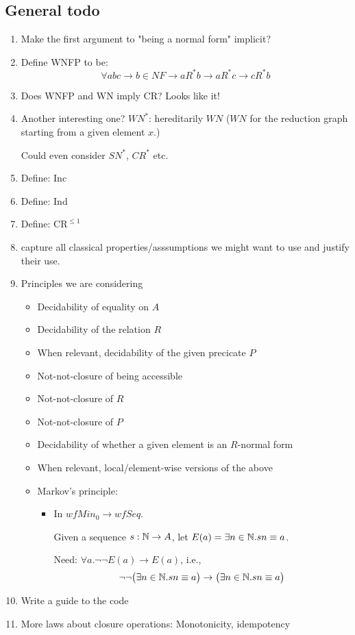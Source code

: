 \documentclass{scrartcl}
\begin{document}
\subsection*{General todo}
\begin{enumerate}
   
  \item  Make the first argument to "being a normal form" implicit?
  \item Define WNFP to be:
  \[\forall a b c \to b \in NF \to a R^* b \to a R^* c \to c R^* b \]
  \item Does WNFP and WN imply CR?  Looks like it!
  \item  Another interesting one? $WN^*$: hereditarily $WN$ ($WN$ for the reduction graph starting from a given element $x$.)

  Could even consider $SN^*$, $CR^*$ etc.
  \item Define: Inc
  \item Define: Ind
  \item Define: $\mathrm{CR}^{\le 1}$
  \item capture all classical properties/asssumptions we might want to use and justify their use. 
  \item Principles we are considering
  \begin{itemize}
    \item Decidability of equality on $A$
    \item Decidability of the relation $R$
    \item When relevant, decidability of the given precicate $P$
    \item Not-not-closure of being accessible
    \item Not-not-closure of $R$
    \item Not-not-closure of $P$
    \item Decidability of whether a given element is an $R$-normal form
    \item When relevant, local/element-wise versions of the above
    \item Markov's principle:
    \begin{itemize}
      \item In $wfMin_0 \to wfSeq$.
  
      Given a sequence $s : \mathbb{N} \to A$, let $E(a) = \exists n \in \mathbb{N}. s n \equiv a$.
  
      Need: $\forall a. \lnot\lnot E(a) \to E(a)$, i.e.,
      \[\lnot\lnot \big(\exists n \in \mathbb{N}. s n \equiv a\big)
            \to \big(\exists n \in \mathbb{N}. s n \equiv a\big)\]
  
    \end{itemize}
  \end{itemize}
  \item Write a guide to the code
  \item More laws about closure operations: Monotonicity, idempotency

\end{enumerate}
\newpage
\end{document}
